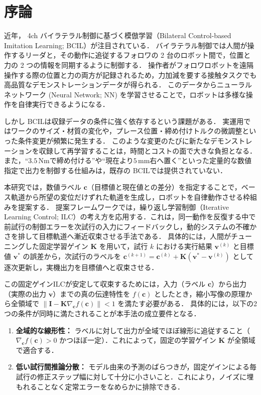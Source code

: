 \section{序論}
\label{sec:introduction}

近年， 4ch バイラテラル制御に基づく模倣学習（Bilateral Control-based Imitation Learning; BCIL）が注目されている\cite{Sasagawa2020}．
バイラテラル制御では人間が操作するリーダと，その動作に追従するフォロワの 2 台のロボット間で，位置と力の 2 つの情報を同期するように制御する．
操作者がフォロワロボットを遠隔操作する際の位置と力の両方が記録されるため，力加減を要する接触タスクでも高品質なデモンストレーションデータが得られる．
このデータからニューラルネットワーク (Neural Network; NN) を学習させることで，ロボットは多様な操作を自律実行できるようになる\cite{Buamanee2024, saigusa2021pancake}．

しかし BCILは収録データの条件に強く依存するという課題がある．
実運用ではワークのサイズ・材質の変化や，プレース位置・締め付けトルクの微調整といった条件変更が頻繁に発生する．
このような変更のたびに新たなデモンストレーションを収録して再学習することは，時間とコストの面で大きな負担となる．
また，``$3.5\,\text{Nm}$で締め付ける''や``現在より$5\,\text{mm}$右へ置く''といった定量的な数値指定で出力を制御する仕組みは，既存の BCILでは提供されていない\cite{Kobayashi2025biLAT}．

本研究では，数値ラベル $\bm{c}$（目標値と現在値との差分）を指定することで，ベース軌道から所望の変位だけずれた軌道を生成し，ロボットを自律動作させる枠組みを提案する．
提案フレームワークでは，繰り返し学習制御（Iterative Learning Control; ILC）\cite{Arimoto1984ILC}の考え方を応用する．これは，同一動作を反復する中で前試行の制御エラーを次試行の入力にフィードバックし，動的システムの不確かさを排して目標軌道へ漸近収束させる手法である．
具体的には，人間がチューニングした固定学習ゲイン $\bm{K}$ を用いて，試行 $k$ における実行結果 $\bm{v}^{(k)}$ と目標値 $\bm{v}^*$ の誤差から，次試行のラベルを $\bm{c}^{(k+1)} = \bm{c}^{(k)} + \bm{K}(\bm{v}^* - \bm{v}^{(k)})$ として逐次更新し，実機出力を目標値へと収束させる．

この固定ゲインILCが安定して収束するためには，入力（ラベル $\bm{c}$）から出力（実際の出力 $\bm{v}$）までの真の伝達特性を $f(\bm{c})$ としたとき，縮小写像の原理から全領域で $\| \bm{I} - \bm{K} \nabla_{\bm{c}} f(\bm{c}) \| < 1$ を満たす必要がある．
具体的には，以下の2つの条件が同時に満たされることが本手法の成立要件となる．
\begin{enumerate}
    \item \textbf{全域的な線形性：} ラベルに対して出力が全域でほぼ線形に追従すること（$\nabla_{\bm{c}} f(\bm{c}) > 0$ かつほぼ一定）．これによって，固定の学習ゲイン $\bm{K}$ が全領域で適合する．
    \item \textbf{低い試行間推論分散：} モデル由来の予測のばらつきが，固定ゲインによる毎試行の修正ステップ幅に対して十分に小さいこと．これにより，ノイズに埋もれることなく定常エラーをなめらかに排除できる．
\end{enumerate}

